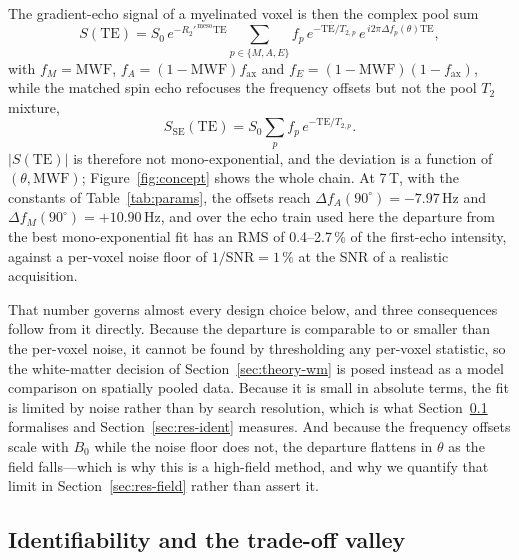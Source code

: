 \documentclass[AMA,STIX2COL,Linenumberson]{MRM}
\begin{document}
The gradient-echo signal of a myelinated voxel is then the complex pool sum
\begin{equation}
S(\mathrm{TE}) = S_0\, e^{-R_2'^{\,\mathrm{meso}}\mathrm{TE}} \sum_{p\in\{M,A,E\}} f_p \, e^{-\mathrm{TE}/T_{2,p}}\, e^{\,i2\pi \Delta f_p(\theta)\mathrm{TE}},
\label{eq:gre}
\end{equation}
with $f_M=\mathrm{MWF}$, $f_A=(1-\mathrm{MWF})f_{\mathrm{ax}}$ and $f_E=(1-\mathrm{MWF})(1-f_{\mathrm{ax}})$, while the matched spin echo refocuses the frequency offsets but not the pool $T_2$ mixture,
\begin{equation}
S_{\mathrm{SE}}(\mathrm{TE}) = S_0 \sum_p f_p\, e^{-\mathrm{TE}/T_{2,p}} .
\label{eq:se}
\end{equation}
$|S(\mathrm{TE})|$ is therefore not mono-exponential, and the deviation is a function of $(\theta,\mathrm{MWF})$; Figure~\ref{fig:concept} shows the whole chain. At 7\,T, with the constants of Table~\ref{tab:params}, the offsets reach $\Delta f_A(90^\circ)=-7.97$\,Hz and $\Delta f_M(90^\circ)=+10.90$\,Hz, and over the echo train used here the departure from the best mono-exponential fit has an RMS of 0.4--2.7\,\% of the first-echo intensity, against a per-voxel noise floor of $1/\mathrm{SNR}=1\,\%$ at the SNR of a realistic acquisition.

That number governs almost every design choice below, and three consequences follow from it directly. Because the departure is comparable to or smaller than the per-voxel noise, it cannot be found by thresholding any per-voxel statistic, so the white-matter decision of Section~\ref{sec:theory-wm} is posed instead as a model comparison on spatially pooled data. Because it is small in absolute terms, the fit is limited by noise rather than by search resolution, which is what Section~\ref{sec:theory-valley} formalises and Section~\ref{sec:res-ident} measures. And because the frequency offsets scale with $B_0$ while the noise floor does not, the departure flattens in $\theta$ as the field falls---which is why this is a high-field method, and why we quantify that limit in Section~\ref{sec:res-field} rather than assert it.

\subsection{Identifiability and the trade-off valley}
\label{sec:theory-valley}
\end{document}
